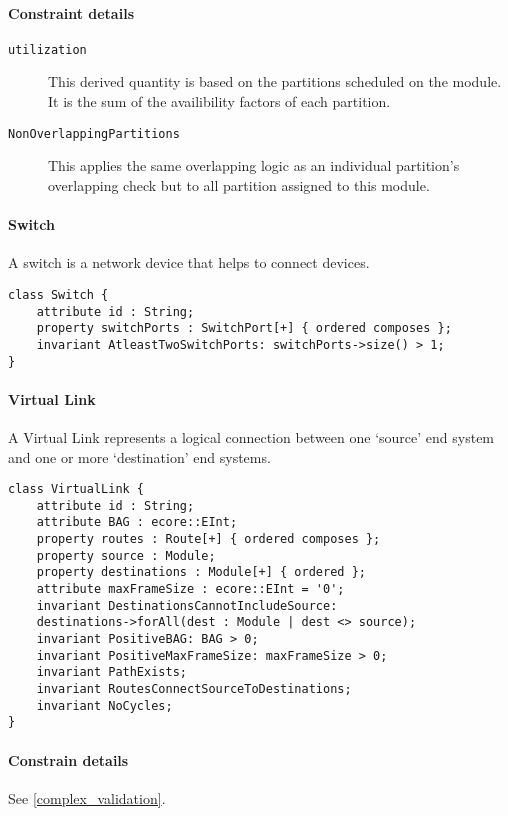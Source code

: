 \paragraph{Constraint details}
\begin{description}
    \item[\texttt{utilization}] This derived quantity is based on the partitions scheduled on the module.
	It is the sum of the availibility factors of each partition. 
    \item[\texttt{NonOverlappingPartitions}] This applies the same overlapping logic as an individual partition's overlapping
	check but to all partition assigned to this module.
\end{description}
\paragraph{Switch} A switch is a network device that helps to connect devices.
\begin{lstlisting}[caption=Switch constraints]
class Switch {
    attribute id : String;
    property switchPorts : SwitchPort[+] { ordered composes };
    invariant AtleastTwoSwitchPorts: switchPorts->size() > 1;
}
\end{lstlisting}

\paragraph{Virtual Link} A Virtual Link represents a logical connection between
one `source' end system and one or more `destination' end systems.
\begin{lstlisting}[caption=Virtual Link constraints]
class VirtualLink {
    attribute id : String;
    attribute BAG : ecore::EInt;
    property routes : Route[+] { ordered composes };
    property source : Module;
    property destinations : Module[+] { ordered };
    attribute maxFrameSize : ecore::EInt = '0';
    invariant DestinationsCannotIncludeSource: 
    destinations->forAll(dest : Module | dest <> source);
    invariant PositiveBAG: BAG > 0;
    invariant PositiveMaxFrameSize: maxFrameSize > 0;
    invariant PathExists;
    invariant RoutesConnectSourceToDestinations;
    invariant NoCycles;
}
\end{lstlisting}
\paragraph{Constrain details} See \ref{complex_validation}.


